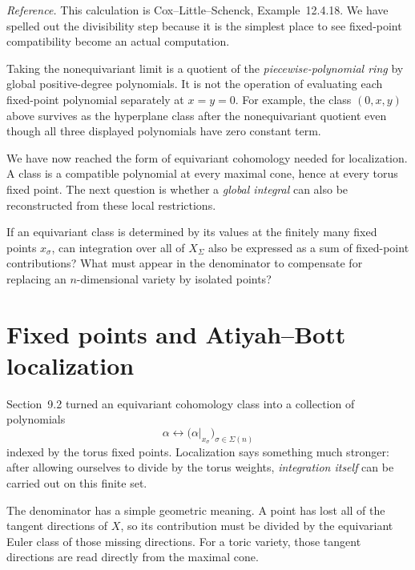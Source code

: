 \noindent
\textit{Reference.}
This calculation is Cox--Little--Schenck, Example~12.4.18. We have
spelled out the divisibility step because it is the simplest place to
see fixed-point compatibility become an actual computation.

\begin{warningbox}
Taking the nonequivariant limit is a quotient of the
\emph{piecewise-polynomial ring} by global positive-degree
polynomials. It is not the operation of evaluating each fixed-point
polynomial separately at \(x=y=0\). For example, the class
\((0,x,y)\) above survives as the hyperplane class after the
nonequivariant quotient even though all three displayed polynomials
have zero constant term.
\end{warningbox}

We have now reached the form of equivariant cohomology needed for
localization. A class is a compatible polynomial at every maximal
cone, hence at every torus fixed point. The next question is whether a
\emph{global integral} can also be reconstructed from these local
restrictions.

\begin{guidingquestion}
If an equivariant class is determined by its values at the finitely
many fixed points \(x_\sigma\), can integration over all of
\(X_\Sigma\) also be expressed as a sum of fixed-point contributions?
What must appear in the denominator to compensate for replacing an
\(n\)-dimensional variety by isolated points?
\end{guidingquestion}

\section{Fixed points and Atiyah--Bott localization}
\label{sec:fixed-points-localization}

Section~9.2 turned an equivariant cohomology class into a collection
of polynomials
\[
\alpha
\longleftrightarrow
\bigl(\alpha|_{x_\sigma}\bigr)_{\sigma\in\Sigma(n)}
\]
indexed by the torus fixed points.  Localization says something much
stronger: after allowing ourselves to divide by the torus weights,
\emph{integration itself} can be carried out on this finite set.

The denominator has a simple geometric meaning.  A point has lost all
of the tangent directions of \(X\), so its contribution must be divided
by the equivariant Euler class of those missing directions.  For a
toric variety, those tangent directions are read directly from the
maximal cone.

